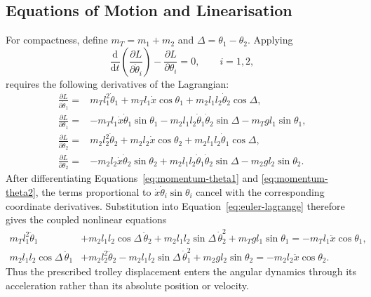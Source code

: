 \documentclass[a4paper,11pt]{article}
\begin{document}
\subsection{Equations of Motion and Linearisation}

For compactness, define \(m_T=m_1+m_2\) and
\(\Delta=\theta_1-\theta_2\). Applying
\begin{equation}
    \frac{\mathrm d}{\mathrm dt}
    \left(\frac{\partial L}{\partial\dot{\theta}_i}\right)
    -\frac{\partial L}{\partial\theta_i}=0,
    \qquad i=1,2,
    \label{eq:euler-lagrange}
\end{equation}
requires the following derivatives of the Lagrangian:
\begin{align}
    \frac{\partial L}{\partial\dot{\theta}_1}
    ={}&m_Tl_1^2\dot{\theta}_1
       +m_Tl_1\dot{x}\cos\theta_1
       +m_2l_1l_2\dot{\theta}_2\cos\Delta,
       \label{eq:momentum-theta1}\\
    \frac{\partial L}{\partial\theta_1}
    ={}&-m_Tl_1\dot{x}\dot{\theta}_1\sin\theta_1
       -m_2l_1l_2\dot{\theta}_1\dot{\theta}_2\sin\Delta
       -m_Tgl_1\sin\theta_1,
       \label{eq:coordinate-theta1}\\
    \frac{\partial L}{\partial\dot{\theta}_2}
    ={}&m_2l_2^2\dot{\theta}_2
       +m_2l_2\dot{x}\cos\theta_2
       +m_2l_1l_2\dot{\theta}_1\cos\Delta,
       \label{eq:momentum-theta2}\\
    \frac{\partial L}{\partial\theta_2}
    ={}&-m_2l_2\dot{x}\dot{\theta}_2\sin\theta_2
       +m_2l_1l_2\dot{\theta}_1\dot{\theta}_2\sin\Delta
       -m_2gl_2\sin\theta_2.
       \label{eq:coordinate-theta2}
\end{align}
After differentiating Equations~\eqref{eq:momentum-theta1} and
\eqref{eq:momentum-theta2}, the terms proportional to
\(\dot{x}\dot{\theta}_i\sin\theta_i\) cancel with the corresponding coordinate
derivatives. Substitution into Equation~\eqref{eq:euler-lagrange} therefore
gives the coupled nonlinear equations
\begin{align}
    m_Tl_1^2\ddot{\theta}_1
    &+m_2l_1l_2\cos\Delta\,\ddot{\theta}_2
    +m_2l_1l_2\sin\Delta\,\dot{\theta}_2^2
    +m_Tgl_1\sin\theta_1
    =-m_Tl_1\ddot{x}\cos\theta_1,
    \label{eq:nonlinear-theta1}\\
    m_2l_1l_2\cos\Delta\,\ddot{\theta}_1
    &+m_2l_2^2\ddot{\theta}_2
    -m_2l_1l_2\sin\Delta\,\dot{\theta}_1^2
    +m_2gl_2\sin\theta_2
    =-m_2l_2\ddot{x}\cos\theta_2.
    \label{eq:nonlinear-theta2}
\end{align}
Thus the prescribed trolley displacement enters the angular dynamics through
its acceleration rather than its absolute position or velocity.
\end{document}
